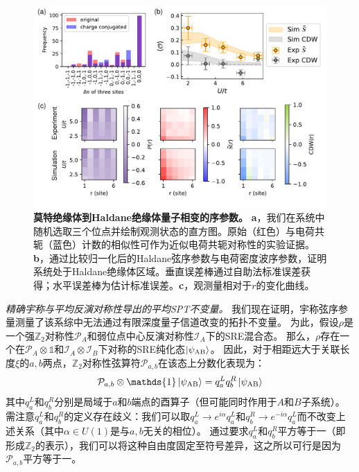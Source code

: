 \documentclass[preprint,superscriptaddress,floatfix, nofootinbib]{revtex4-2}
\begin{document}
\begin{CJK*}{UTF8}{gbsn}
\begin{figure}
    \centering
    \includegraphics[width=\textwidth]{figures/HI_2D_OP.pdf}
    \caption{\textbf{莫特绝缘体到Haldane绝缘体量子相变的序参数。} \textbf{a}，我们在系统中随机选取三个位点并绘制观测状态的直方图。原始（红色）与电荷共轭（蓝色）计数的相似性可作为近似电荷共轭对称性的实验证据。\textbf{b}，通过比较归一化后的Haldane弦序参数与电荷密度波序参数，证明系统处于Haldane绝缘体区域。垂直误差棒通过自助法标准误差获得；水平误差棒为估计标准误差。\textbf{c}，观测量相对于$r$的变化曲线。
    }
    \label{fig: HI_2D_OP}
\end{figure}
\textit{精确宇称与平均反演对称性导出的平均SPT不变量。} 我们现在证明，宇称弦序参量测量了该系综中无法通过有限深度量子信道改变的拓扑不变量。
为此，假设$\rho$是一个强$\mathbb{Z}_2$对称性$\mathcal{P}_A$和弱位点中心反演对称性$\mathcal{I}_A$下的SRE混合态。
那么，$\rho$存在一个在$\mathcal{P}_A \otimes \mathds{1}$和$\mathcal{I}_A \otimes \mathcal{I}_B$下对称的SRE纯化态$\ket{\psi_{\text{AB}}}$。
因此，对于相距远大于关联长度$\xi$的$a, b$两点，$\mathbb{Z}_2$对称性弦算符$\mathcal{P}_{a, b}$在该态上分数化表现为：
\begin{equation}
    \mathcal{P}_{a, b} \otimes \mathds{1} \ket{\psi_{\text{AB}}} = q^L_a q^R_b \ket{\psi_{\text{AB}}}
\end{equation}
其中$q^L_a$和$q^R_b$分别是局域于$a$和$b$端点的酉算子（但可能同时作用于$A$和$B$子系统）。
需注意$q^L_a$和$q^R_b$的定义存在歧义：我们可以取$q_{a}^L \to e^{i \alpha} q_a^{L}$和$q_{b}^{R} \to e^{-i \alpha} q_a^{L}$而不改变上述关系（其中$\alpha \in U(1)$是与$a, b$无关的相位）。
通过要求$q_a^L$和$q_b^R$平方等于一（即形成$\mathbb{Z}_2$的表示），我们可以将这种自由度固定至符号差异，这之所以可行是因为$\mathcal{P}_{a, b}$平方等于一。

\end{CJK*}
\end{document}
